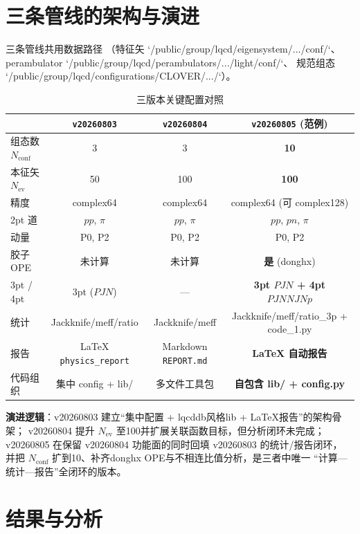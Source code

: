 \documentclass[11pt,a4paper]{article}
\newcommand{\Nconf}{N_{\mathrm{conf}}}
\newcommand{\Nev}{N_{\mathrm{ev}}}
\begin{document}
\section{三条管线的架构与演进}
三条管线共用数据路径
（特征矢 `/public/group/lqcd/eigensystem/.../{conf}/`、
perambulator `/public/group/lqcd/perambulators/.../light/{conf}/`、
规范组态 `/public/group/lqcd/configurations/CLOVER/.../`）。

\begin{table}[H]
\centering
\caption{三版本关键配置对照}
\label{tab:version-compare}
\small
\begin{tabular}{lccc}
\toprule
& \texttt{v20260803} & \texttt{v20260804} & \texttt{v20260805} (范例)\\
\midrule
组态数 $\Nconf$ & 3 & 3 & \textbf{10}\\
本征矢 $\Nev$ & 50 & 100 & \textbf{100}\\
精度 & complex64 & complex64 & complex64 (可 complex128)\\
2pt 道 & $pp$, $\pi$ & $pp$, $\pi$ & $pp$, $pn$, $\pi$\\
动量 & P0, P2 & P0, P2 & P0, P2\\
胶子 OPE & 未计算 & 未计算 & \textbf{是} (donghx)\\
3pt / 4pt & 3pt ($PJN$) & — & \textbf{3pt $PJN$ + 4pt $PJNNJNp$}\\
统计 & Jackknife/meff/ratio & Jackknife/meff & Jackknife/meff/ratio\_3p + code\_1.py\\
报告 & LaTeX \texttt{physics\_report} & Markdown \texttt{REPORT.md} & \textbf{LaTeX 自动报告}\\
代码组织 & 集中 config + lib/ & 多文件工具包 & \textbf{自包含 lib/ + config.py}\\
\bottomrule
\end{tabular}
\end{table}

\textbf{演进逻辑}：v20260803 建立“集中配置 + lqcddb风格lib + LaTeX报告”的架构骨架；
v20260804 提升 $\Nev$ 至100并扩展关联函数目标，但分析闭环未完成；
v20260805 在保留 v20260804 功能面的同时回填 v20260803 的统计/报告闭环，
并把 $\Nconf$ 扩到10、补齐donghx OPE与不相连比值分析，是三者中唯一
“计算—统计—报告”全闭环的版本。

\section{结果与分析}
\end{document}
